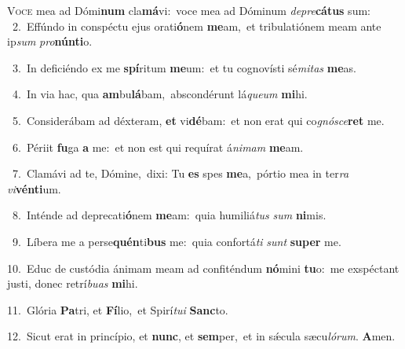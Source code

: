 \lettrine{\initial\textcolor{\initialcolor}{V}}{oce} mea ad Dómi\textbf{num} cla\-\textbf{má}\-vi:~\star voce mea ad Dóminum \textit{de}\-\textit{pre}\textbf{cá}\textbf{tus} sum:\\
{\numbfont\textcolor{\numbcolor}{~2.}}~Effúndo in conspéctu ejus orati\-\textbf{ó}\-nem \textbf{me}\-am,~\star et tribulatiónem meam ante ip\textit{sum} \textit{pro}\-\textbf{nún}\textbf{ti}o.\par
{\numbfont\textcolor{\numbcolor}{~3.}}~In deficiéndo ex me \textbf{spí}\-ritum \textbf{me}\-um:~\star et tu cognovísti sé\-\textit{mi}\-\textit{tas} \textbf{me}\-as.\par
{\numbfont\textcolor{\numbcolor}{~4.}}~In via hac, qua \textbf{am}\-bu\-\textbf{lá}\-bam,~\star abscondérunt lá\-\textit{que}\-\textit{um} \textbf{mi}\-hi.\par
{\numbfont\textcolor{\numbcolor}{~5.}}~Considerábam ad déxteram, \textbf{et} vi\-\textbf{dé}\-bam:~\star et non erat qui co\-\textit{gnó}\-\textit{sce}\textbf{ret} me.\par
{\numbfont\textcolor{\numbcolor}{~6.}}~Périit \textbf{fu}\-ga \textbf{a} me:~\star et non est qui requírat á\-\textit{ni}\-\textit{mam} \textbf{me}\-am.\par
{\numbfont\textcolor{\numbcolor}{~7.}}~Clamávi ad te, Dómine,~\dagger dixi: Tu \textbf{es} spes \textbf{me}\-a,~\star pórtio mea in ter\textit{ra} \textit{vi}\-\textbf{vén}\textbf{ti}um.\par
{\numbfont\textcolor{\numbcolor}{~8.}}~Inténde ad deprecati\-\textbf{ó}\-nem \textbf{me}\-am:~\star quia humiliá\textit{tus} \textit{sum} \textbf{ni}\-mis.\par
{\numbfont\textcolor{\numbcolor}{~9.}}~Líbera me a perse\-\textbf{quén}\-ti\textbf{bus} me:~\star quia confortá\textit{ti} \textit{sunt} \textbf{su}\-\textbf{per} me.\par
{\numbfont\textcolor{\numbcolor}{10.}}~Educ de custódia ánimam meam ad confiténdum \textbf{nó}\-mini \textbf{tu}\-o:~\star me exspéctant justi, donec retrí\-\textit{bu}\-\textit{as} \textbf{mi}\-hi.\par
{\numbfont\textcolor{\numbcolor}{11.}}~Glória \textbf{Pa}\-tri, et \textbf{Fí}\-lio,~\star et Spirí\-\textit{tu}\-\textit{i} \textbf{Sanc}\-to.\par
{\numbfont\textcolor{\numbcolor}{12.}}~Sicut erat in princípio, et \textbf{nunc}\-, et \textbf{sem}\-per,~\star et in sǽcula sæcu\-\textit{ló}\-\textit{rum}. \textbf{A}\-men.\par
